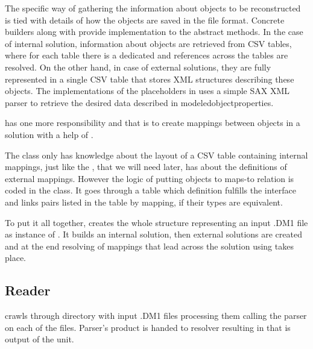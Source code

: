 The specific way of gathering the information about objects to be reconstructed is tied with details of how the objects are saved in the file format. Concrete builders 	 along with  provide implementation to the abstract methods.
In the case of internal solution, information about objects are retrieved from CSV tables, where for each table there is a dedicated and references across the tables are resolved.
On the other hand, in case of external solutions, they are fully represented in a single CSV table that stores XML structures describing these objects. The implementations of the placeholders in  uses a simple SAX XML parser to retrieve the desired data described in modeledobjectproperties.

 has one more responsibility and that is to create mappings between  objects in a solution with a help of . 

The   class only has knowledge about the layout of a CSV table containing internal mappings, just like the , that we will need later, has about the definitions of external mappings. However the logic of putting objects to maps-to relation is coded in the  class.
It goes through a table which definition fulfills the interface  and links pairs listed in the table by mapping, if their types are equivalent.

To put it all together,  creates the whole structure representing an input .DM1 file as instance of . It builds an internal solution, then external solutions are created and at the end resolving of mappings that lead across the solution using  takes place.


\subsection{Reader}

 crawls through directory with input .DM1 files processing them calling the parser on each of the files. Parser's product is handed to resolver resulting in  that is output of the unit.

